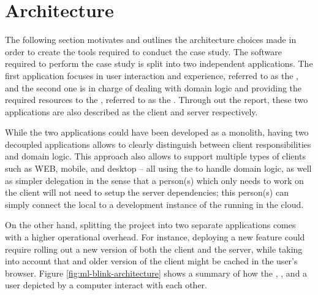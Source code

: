 \section{Architecture} \label{sect:case-study:arch}

The following section motivates and outlines the architecture choices made in order to create the tools required to conduct the case study. The software required to perform the case study is split into two independent applications. The first application focuses in user interaction and experience, referred to as the \mlblinkui, and the second one is in charge of dealing with domain logic and providing the required resources to the \mlblinkui, referred to as the \mlblinkapi. Through out the report, these two applications are also described as the client and server respectively.  \newline

While the two applications could have been developed as a monolith, having two decoupled applications allows to clearly distinguish between client responsibilities and domain logic. This approach also allows to support multiple types of clients such as WEB, mobile, and desktop -- all using the \mlblinkapi to handle domain logic, as well as simpler delegation in the sense that a person(s) which only needs to work on the client will not need to setup the server dependencies; this person(s) can simply connect the local \mlblinkui to a development instance of the \mlblinkapi running in the cloud. \newline

On the other hand, splitting the project into two separate applications comes with a higher operational overhead. For instance, deploying a new feature could require rolling out a new version of both the client and the server, while taking into account that and older version of the client might be cached in the user's browser. Figure \ref{fig:ml-blink-architecture} shows a summary of how the \mlblinkui, \mlblinkapi, and a user depicted by a computer interact with each other.

